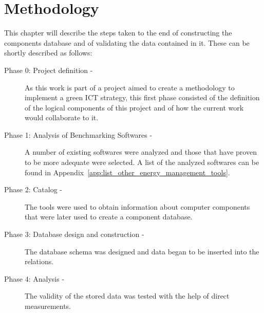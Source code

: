 

\chapter{Methodology} \label{chap3:methodology}

	This chapter will describe the steps taken to the end of constructing the components database and of validating the data contained in it.
These can be shortly described as follows:
    \begin{description}
        \item[Phase 0: Project definition -] As this work is part of a project aimed to create a methodology to implement a green ICT strategy, this first phase consisted of the definition of the logical components of this project and of how the current work would collaborate to it.
        \item[Phase 1: Analysis of Benchmarking Softwares -] A number of existing softwares were analyzed and those that have proven to be more adequate were selected. A list of the analyzed softwares can be found in Appendix~\ref{app:list_other_energy_management_tools}.
        \item[Phase 2: Catalog -] The tools were used to obtain information about computer components that were later used to create a component database.
        \item[Phase 3: Database design and construction -] The database schema was designed and data began to be inserted into the relations.
        \item[Phase 4: Analysis -] The validity of the stored data was tested with the help of direct measurements.
    \end{description}


